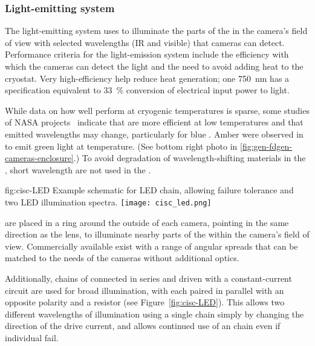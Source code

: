 \subsubsection{Light-emitting system}
The light-emitting system uses  to illuminate
the parts of the %
 in the camera's field of view with selected
wavelengths (IR and visible) that cameras can detect.  Performance criteria for the light-emission system include the efficiency with which the cameras can detect the light and the need to avoid
adding heat to the cryostat. Very high-efficiency
help reduce heat generation; one \SI{750}{nm}  \cite{lumileds-DS144-pdf}
has a specification equivalent to
\SI{33}{\%} conversion of electrical input power to light.

While data on how well  perform at cryogenic temperatures
is sparse, some studies of NASA projects~\cite{Carron:2017zzz}
indicate that  are more efficient at low temperatures and
that emitted wavelengths may change, particularly for blue
.  Amber  were observed in  to
emit green light at  temperature. (See bottom right photo
in \ref{fig:gen-fdgen-cameras-enclosure}.)  To avoid degradation of
wavelength-shifting materials in the , short wavelength
 are not used in the .

\begin{dunefigure}{fig:cisc-LED}
  {Example schematic for LED chain, allowing failure tolerance and two LED illumination spectra.}
  \texttt{[image: cisc\_led.png]}
\end{dunefigure}

 are placed in a ring around the outside of each
camera, pointing in the same direction as the lens, to 
illuminate nearby parts of the  within the camera's field of
view. Commercially available  exist with
a range of angular spreads that can be matched to the needs of the
cameras without additional optics.

Additionally, chains of  connected in series and driven with a
constant-current circuit are used for broad illumination, with each
 paired in parallel with an opposite polarity  and a resistor
(see Figure~\ref{fig:cisc-LED}).
This allows two different wavelengths of illumination using a single chain simply by changing the direction of the drive current, and allows continued use of an  chain even if individual  fail.



